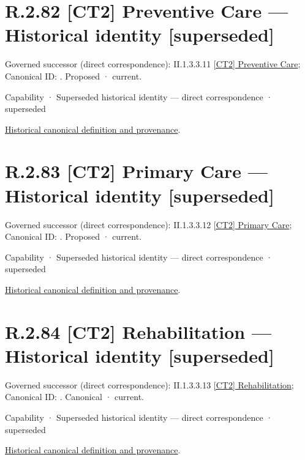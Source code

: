 \section*{R.2.82 [CT2] Preventive Care — Historical identity [superseded]}
\label{navigation:R.2.82}

{\small Governed successor (direct correspondence): II.1.3.3.11 \hyperref[element:dfdc4f0273ba4910848b3b65c9ef6ab2]{[CT2] Preventive Care}; Canonical ID: \texttt{}. Proposed · current.}\par
\label{element:97f0d1acc37b4ca994c6c1ca006f2daa}
{\small Capability · Superseded historical identity — direct correspondence · superseded}\par
\href{../../../../continuum/strategy/capability/97f0d1acc37b4ca994c6c1ca006f2daa.md}{Historical canonical definition and provenance}.\par
\section*{R.2.83 [CT2] Primary Care — Historical identity [superseded]}
\label{navigation:R.2.83}

{\small Governed successor (direct correspondence): II.1.3.3.12 \hyperref[element:d118673d77d74c8cb8cec24f03adddd8]{[CT2] Primary Care}; Canonical ID: \texttt{}. Proposed · current.}\par
\label{element:fe9d58b5cfe14e8cb7a83a1ac6686d65}
{\small Capability · Superseded historical identity — direct correspondence · superseded}\par
\href{../../../../continuum/strategy/capability/fe9d58b5cfe14e8cb7a83a1ac6686d65.md}{Historical canonical definition and provenance}.\par
\section*{R.2.84 [CT2] Rehabilitation — Historical identity [superseded]}
\label{navigation:R.2.84}

{\small Governed successor (direct correspondence): II.1.3.3.13 \hyperref[element:99ed51abcc5e4e8ba3b3d0161b17544a]{[CT2] Rehabilitation}; Canonical ID: \texttt{}. Canonical · current.}\par
\label{element:28ec21d5918a49aaac12740c69f42d77}
{\small Capability · Superseded historical identity — direct correspondence · superseded}\par
\href{../../../../continuum/strategy/capability/28ec21d5918a49aaac12740c69f42d77.md}{Historical canonical definition and provenance}.\par

